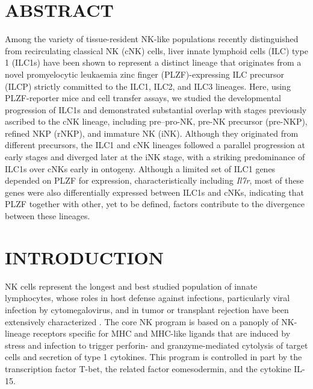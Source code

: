 \section{ABSTRACT}

Among the variety of tissue-resident NK-like populations recently distinguished from recirculating classical NK (cNK) cells, liver innate lymphoid cells (ILC) type 1 (ILC1s) have been shown to represent a distinct lineage that originates from a novel promyelocytic leukaemia zinc finger (PLZF)-expressing ILC precursor (ILCP) strictly committed to the ILC1, ILC2, and ILC3 lineages. Here, using PLZF-reporter mice and cell transfer assays, we studied the developmental progression of ILC1s and demonstrated substantial overlap with stages previously ascribed to the cNK lineage, including pre–pro-NK, pre-NK precursor (pre-NKP), refined NKP (rNKP), and immature NK (iNK). Although they originated from different precursors, the ILC1 and cNK lineages followed a parallel progression at early stages and diverged later at the iNK stage, with a striking predominance of ILC1s over cNKs early in ontogeny. Although a limited set of ILC1 genes depended on PLZF for expression, characteristically including \textit{Il7r}, most of these genes were also differentially expressed between ILC1s and cNKs, indicating that PLZF together with other, yet to be defined, factors contribute to the divergence between these lineages.

\section{INTRODUCTION}

NK cells represent the longest and best studied population of innate lymphocytes, whose roles in host defense against infections, particularly viral infection by cytomegalovirus, and in tumor or transplant rejection have been extensively characterized \cite{sun2009,yokoyama2004,vivier2011}. The core NK program is based on a panoply of NK-lineage receptors specific for MHC and MHC-like ligands that are induced by stress and infection to trigger perforin- and granzyme-mediated cytolysis of target cells and secretion of type 1 cytokines. This program is controlled in part by the transcription factor T-bet, the related factor eomesodermin, and the cytokine IL-15.


